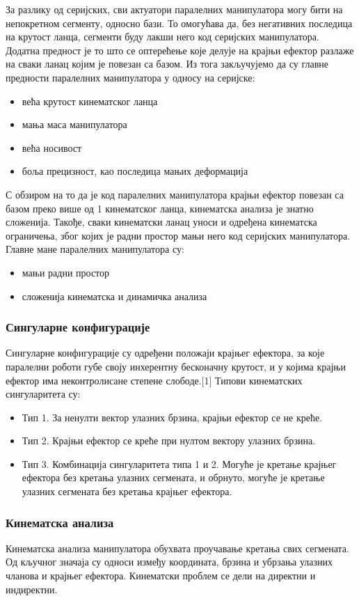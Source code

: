 \documentclass[12pt]{article}
\begin{document}
За разлику од серијских, сви актуатори паралелних манипулатора могу бити на непокретном сегменту, односно бази. То омогућава да, без негативних последица на крутост ланца, сегменти буду лакши него код серијских манипулатора. Додатна предност је то што се оптерећење које делује на крајњи ефектор разлаже на сваки ланац којим је повезан са базом. Из тога закључујемо да су главне предности паралелних манипулатора у односу на серијске:
\begin{itemize}
    \item већа крутост кинематског ланца
    \item мања маса манипулатора
    \item већа носивост
    \item боља прецизност, као последица мањих деформација
\end{itemize}
С обзиром на то да је код паралелних манипулатора крајњи ефектор повезан са базом преко више од 1 кинематског ланца, кинематска анализа је знатно сложенија. Такође, сваки кинематски ланац уноси и одређена кинематска ограничења, због којих је радни простор мањи него код серијских манипулатора. 
Главне мане паралелних манипулатора су:
\begin{itemize}
    \item мањи радни простор
    \item сложенија кинематска и динамичка анализа
\end{itemize}

\subsubsection{Сингуларне конфигурације}
Сингуларне конфигурације су одређени положаји крајњег ефектора, за које паралелни роботи губе своју инхерентну бесконачну крутост, и у којима крајњи ефектор има неконтролисане степене слободе.[1] Типови кинематских сингуларитета су:
\begin{itemize}
    \item Тип 1. За ненулти вектор улазних брзина, крајњи ефектор се не креће.
    \item Тип 2. Крајњи ефектор се креће при нултом вектору улазних брзина.
    \item Тип 3. Комбинација сингуларитета типа 1 и 2. Могуће је кретање крајњег ефектора без кретања улазних сегмената, и обрнуто, могуће је кретање улазних сегмената без кретања крајњег ефектора.
\end{itemize}

\subsubsection{Кинематска анализа}
Кинематска анализа манипулатора обухвата проучавање кретања свих сегмената. Од кључног значаја су односи између координата, брзина и убрзања улазних чланова и крајњег ефектора. Кинематски проблем се дели на директни и индиректни.
\end{document}
